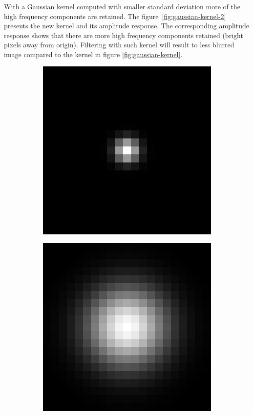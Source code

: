 \documentclass[]{article}
\begin{document}
With a Gaussian kernel computed with smaller standard deviation more of the high
frequency components are retained. The figure~\ref{fig:gaussian-kernel-2}
presents the new kernel and its amplitude response. The corresponding amplitude
response shows that there are more high frequency components retained (bright
pixels away from origin). Filtering with such kernel will result to less blurred
image compared to the kernel in figure \ref{fig:gaussian-kernel}.
\begin{figure}
  \label{fig:gaussian-kernel-2}
  \centering
    \begin{subfigure}[t]{0.49\textwidth}
      \centering
      \includegraphics[width=0.99\linewidth]{kernel2.png}
    \end{subfigure}
    \begin{subfigure}[t]{0.49\textwidth}
      \centering
      \includegraphics[width=0.99\linewidth]{freq2.png}

\end{subfigure}
\end{figure}
\end{document}
